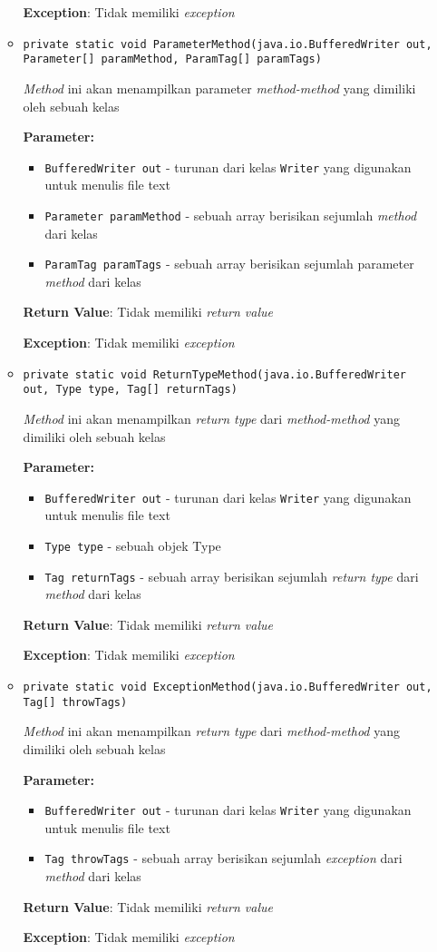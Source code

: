 \documentclass{article}
\begin{document}
\begin{enumerate}
\begin{itemize}
\textbf{Exception}: Tidak memiliki \textit{exception}

\item \texttt{private static void ParameterMethod(java.io.BufferedWriter out, Parameter[] paramMethod, ParamTag[] paramTags)}

\textit{Method} ini akan menampilkan parameter \textit{method-method} yang dimiliki
 oleh sebuah kelas

\textbf{Parameter:}
\begin{itemize}
\item \texttt{BufferedWriter out} - 
turunan dari kelas \texttt{Writer} yang digunakan untuk menulis file text
\item \texttt{Parameter paramMethod} - 
sebuah array berisikan sejumlah \textit{method} dari kelas
\item \texttt{ParamTag paramTags} - 
sebuah array berisikan sejumlah parameter \textit{method} dari kelas
\end{itemize}
\textbf{Return Value}: Tidak memiliki \textit{return value}

\textbf{Exception}: Tidak memiliki \textit{exception}

\item \texttt{private static void ReturnTypeMethod(java.io.BufferedWriter out, Type type, Tag[] returnTags)}

\textit{Method} ini akan menampilkan \textit{return type} dari \textit{method-method} yang dimiliki
 oleh sebuah kelas

\textbf{Parameter:}
\begin{itemize}
\item \texttt{BufferedWriter out} - 
turunan dari kelas \texttt{Writer} yang digunakan untuk menulis file text
\item \texttt{Type type} - 
sebuah objek Type
\item \texttt{Tag returnTags} - 
sebuah array berisikan sejumlah \textit{return type} dari \textit{method} dari kelas
\end{itemize}
\textbf{Return Value}: Tidak memiliki \textit{return value}

\textbf{Exception}: Tidak memiliki \textit{exception}

\item \texttt{private static void ExceptionMethod(java.io.BufferedWriter out, Tag[] throwTags)}

\textit{Method} ini akan menampilkan \textit{return type} dari \textit{method-method} yang dimiliki
 oleh sebuah kelas

\textbf{Parameter:}
\begin{itemize}
\item \texttt{BufferedWriter out} - 
turunan dari kelas \texttt{Writer} yang digunakan untuk menulis file text
\item \texttt{Tag throwTags} - 
sebuah array berisikan sejumlah \textit{exception} dari \textit{method} dari kelas
\end{itemize}
\textbf{Return Value}: Tidak memiliki \textit{return value}

\textbf{Exception}: Tidak memiliki \textit{exception}

\end{itemize}
\end{enumerate}
\end{document}

